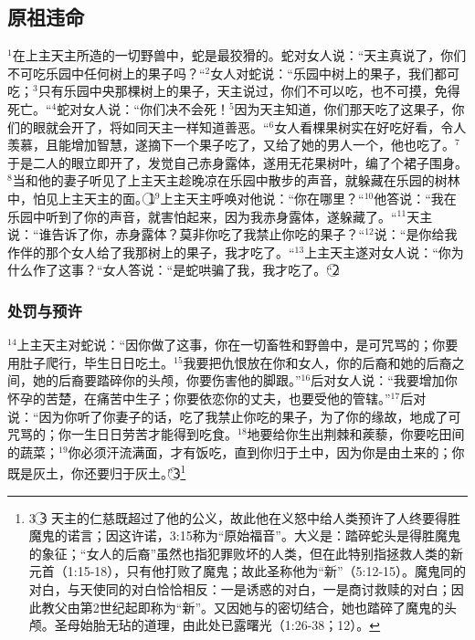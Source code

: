 \subsection{原祖违命}
$^{1}$在上主天主所造的一切野兽中，蛇是最狡猾的。蛇对女人说：“天主真说了，你们不可吃乐园中任何树上的果子吗？“$^{2}$女人对蛇说：“乐园中树上的果子，我们都可吃；$^{3}$只有乐园中央那棵树上的果子，天主说过，你们不可以吃，也不可摸，免得死亡。“$^{4}$蛇对女人说：“你们决不会死！$^{5}$因为天主知道，你们那天吃了这果子，你们的眼就会开了，将如同天主一样知道善恶。“$^{6}$女人看棵果树实在好吃好看，令人羡慕，且能增加智慧，遂摘下一个果子吃了，又给了她的男人一个，他也吃了。$^{7}$于是二人的眼立即开了，发觉自己赤身露体，遂用无花果树叶，编了个裙子围身。$^{8}$当\UL[亚当]和他的妻子听见了上主天主趁晚凉在乐园中散步的声音，就躲藏在乐园的树林中，怕见上主天主的面。\textcircled{1}$^{9}$上主天主呼唤\UL[亚当]对他说：“你在哪里？“$^{10}$他答说：“我在乐园中听到了你的声音，就害怕起来，因为我赤身露体，遂躲藏了。“$^{11}$天主说：“谁告诉了你，赤身露体？莫非你吃了我禁止你吃的果子？“$^{12}$\UL[亚当]说：“是你给我作伴的那个女人给了我那树上的果子，我才吃了。“$^{13}$上主天主遂对女人说：“你为什么作了这事？“女人答说：“是蛇哄骗了我，我才吃了。“\textcircled{2}


\subsubsection{处罚与预许}
$^{14}$上主天主对蛇说：“因你做了这事，你在一切畜牲和野兽中，是可咒骂的；你要用肚子爬行，毕生日日吃土。$^{15}$我要把仇恨放在你和女人，你的后裔和她的后裔之间，她的后裔要踏碎你的头颅，你要伤害他的脚跟。”$^{16}$后对女人说：“我要增加你怀孕的苦楚，在痛苦中生子；你要依恋你的丈夫，也要受他的管辖。”$^{17}$后对\UL[亚当]说：“因为你听了你妻子的话，吃了我禁止你吃的果子，为了你的缘故，地成了可咒骂的；你一生日日劳苦才能得到吃食。$^{18}$地要给你生出荆棘和蒺藜，你要吃田间的蔬菜；$^{19}$你必须汗流满面，才有饭吃，直到你归于土中，因为你是由土来的；你既是灰土，你还要归于灰土。”\textcircled{3}\footnote{3 \textcircled{3} 天主的仁慈既超过了他的公义，故此他在义怒中给人类预许了人终要得胜魔鬼的诺言；因这许诺，3:15称为“原始福音”。大义是：踏碎蛇头是得胜魔鬼的象征；“女人的后裔”虽然也指犯罪败坏的人类，但在此特别指拯救人类的新元首\UL[基督]（1:15-18），只有他打败了魔鬼；故此圣\UL[保禄]称他为“新\UL[亚当]”（5:12-15）。魔鬼同\UL[厄娃]的对白，与天使同\UL[玛利亚]的对白恰恰相反：一是诱惑的对白，一是商讨救赎的对白；因此教父由第2世纪起即称\UL[玛利亚]为“新\UL[厄娃]”。又因她与\UL[基督]的密切结合，她也踏碎了魔鬼的头颅。圣母始胎无玷的道理，由此处已露曙光（1:26-38；12）。}


